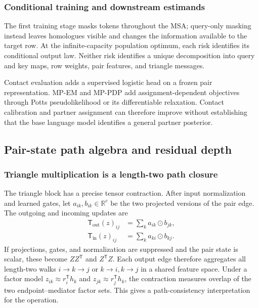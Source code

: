 \subsubsection{Conditional training and downstream estimands}

The first training stage masks tokens throughout the MSA; query-only masking instead leaves
homologues visible and changes the information available to the target row.  At the
infinite-capacity population optimum, each risk identifies its conditional output law.  Neither
risk identifies a unique decomposition into query and key maps, row weights, pair features, and
triangle messages.

Contact evaluation adds a supervised logistic head on a frozen pair representation.  MP-EM and
MP-PDP add assignment-dependent objectives through Potts pseudolikelihood or its differentiable
relaxation.  Contact calibration and partner assignment can therefore improve without establishing
that the base language model identifies a general partner posterior.

\subsection{Pair-state path algebra and residual depth}

\subsubsection{Triangle multiplication is a length-two path closure}

The triangle block has a precise tensor contraction.  After input normalization and learned gates,
let $a_{ik},b_{ik}\in\mathbb R^{c}$ be the two projected versions of the pair edge.  The outgoing
and incoming updates are
\begin{equation}
\begin{aligned}
\mathsf T_{\mathrm{out}}(z)_{ij}
&=\sum_k a_{ik}\odot b_{jk},\\
\mathsf T_{\mathrm{in}}(z)_{ij}
&=\sum_k a_{ki}\odot b_{kj}.
\end{aligned}
\label{eq:msa-pairformer-triangle-contractions}
\end{equation}
If projections, gates, and normalization are suppressed and the pair state is scalar, these become
$ZZ^{\mathsf T}$ and $Z^{\mathsf T}Z$.  Each output edge therefore aggregates all length-two
walks $i\!\to\!k\!\to\!j$ or $k\!\to\!i, k\!\to\!j$ in a shared feature space.  Under a factor
model $z_{ik}\approx r_i^{\mathsf T}h_k$ and $z_{jk}\approx r_j^{\mathsf T}h_k$, the contraction
measures overlap of the two endpoint--mediator factor sets.  This gives a path-consistency
interpretation for the operation.

